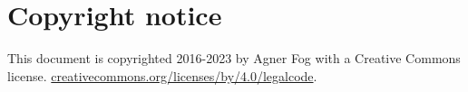 \documentclass[forwardcom.tex]{subfiles}
\begin{document}
\RaggedRight

\chapter{Copyright notice}
This document is copyrighted 2016-2023 by Agner Fog with a Creative Commons license.
\href{https://creativecommons.org/licenses/by/4.0/legalcode}{creativecommons.org/licenses/by/4.0/legalcode}.
\end{document}
